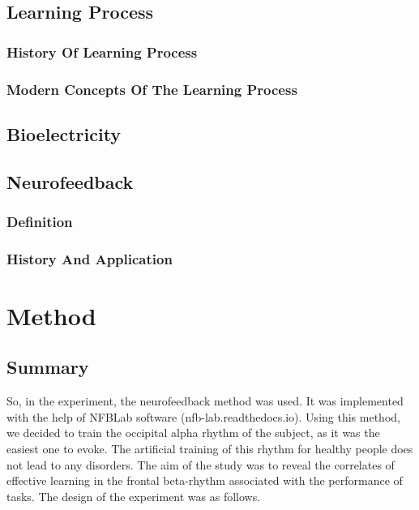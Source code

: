 \documentclass[14pt,a4paper]{scrartcl}
\begin{document}
\subsection{Learning Process}
\label{sec:Hypothesis:Learning Process}

\subsubsection{History Of Learning Process}
\label{sec:Hypothesis:Learning Process:History Of Learning Process}



\subsubsection{Modern Concepts Of The Learning Process}
\label{sec:Hypothesis:Learning Process:Modern Concepts Of The Learning Process}

\subsection{Bioelectricity}
\label{sec:Hypothesis:Bioelectricity}

\subsection{Neurofeedback}
\label{sec:Hypothesis:Neurofeedback}

\subsubsection{Definition}
\label{sec:Hypothesis:Neurofeedback:Definition}

\subsubsection{History And Application}
\label{sec:Hypothesis:Neurofeedback:History And Application}

\newpage
\section{Method}
\label{sec:Method}  

\subsection{Summary}
\label{sec:Methods:Summary}

So, in the experiment, the neurofeedback method was used. It was implemented with the help of NFBLab software (nfb-lab.readthedocs.io). Using this method, we decided to train the occipital alpha rhythm of the subject, as it was the easiest one to evoke. The artificial training of this rhythm for healthy people does not lead to any disorders. The aim of the study was to reveal the correlates of effective learning in the frontal beta-rhythm associated with the performance of tasks. The design of the experiment was as follows.
\end{document}
